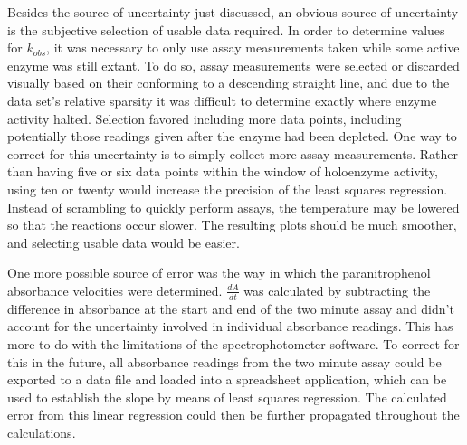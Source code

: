 Besides the source of uncertainty just discussed, an obvious source of uncertainty is the subjective selection of usable data required. In order to determine values for $k_{obs}$, it was necessary to only use assay measurements taken while some active enzyme was still extant. To do so, assay measurements were selected or discarded visually based on their conforming to a descending straight line, and due to the data set's relative sparsity it was difficult to determine exactly where enzyme activity halted. Selection favored including more data points, including potentially those readings given after the enzyme had been depleted. One way to correct for this uncertainty is to simply collect more assay measurements. Rather than having five or six data points within the window of holoenzyme activity, using ten or twenty would increase the precision of the least squares regression. Instead of scrambling to quickly perform assays, the temperature may be lowered so that the reactions occur slower. The resulting plots should be much smoother, and selecting usable data would be easier.

One more possible source of error was the way in which the paranitrophenol absorbance velocities were determined. $\frac{dA}{dt}$ was calculated by subtracting the difference in absorbance at the start and end of the two minute assay and didn't account for the uncertainty involved in individual absorbance readings. This has more to do with the limitations of the spectrophotometer software. To correct for this in the future, all absorbance readings from the two minute assay could be exported to a data file and loaded into a spreadsheet application, which can be used to establish the slope by means of least squares regression. The calculated error from this linear regression could then be further propagated throughout the calculations. 